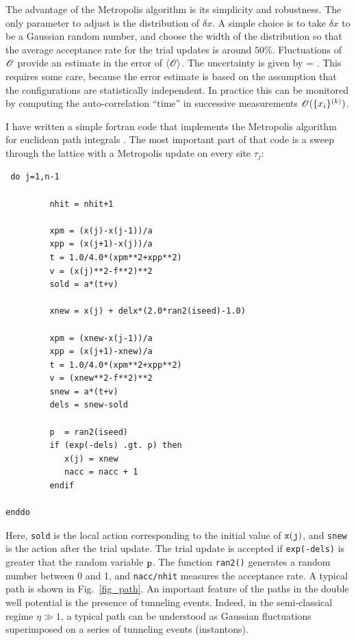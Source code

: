  The advantage of the Metropolis algorithm is its simplicity and robustness. 
The only parameter to adjust is the distribution of $\delta x$. A simple
choice is to take $\delta x$ to be a Gaussian random number, and choose the
width of the distribution so that the average acceptance rate for the trial 
updates is around $50\%$. Fluctuations of ${\cal O}$ provide an estimate 
in the error of $\langle {\cal O}\rangle$. The uncertainty is given by 
\be 
\Delta {} \rangle =
 . 
\ee
This requires some care, because the error estimate is based on 
the assumption that the configurations are statistically independent. 
In practice this can be monitored by computing the auto-correlation 
``time'' in successive measurements ${\cal O}(\{x_i\}^{(k)})$. 

 I have written a simple fortran code that implements the Metropolis 
algorithm for euclidean path integrals \cite{Schafer:2004xa}. The 
most important part of that code is a sweep through the lattice 
with a Metropolis update on every site $\tau_j$: 

\vspace*{0.3cm} 
\begin{lstlisting}
 do j=1,n-1
            
         nhit = nhit+1  
          
         xpm = (x(j)-x(j-1))/a
         xpp = (x(j+1)-x(j))/a
         t = 1.0/4.0*(xpm**2+xpp**2)
         v = (x(j)**2-f**2)**2
         sold = a*(t+v)

         xnew = x(j) + delx*(2.0*ran2(iseed)-1.0)
             
         xpm = (xnew-x(j-1))/a
         xpp = (x(j+1)-xnew)/a
         t = 1.0/4.0*(xpm**2+xpp**2)
         v = (xnew**2-f**2)**2
         snew = a*(t+v)
         dels = snew-sold           
                       
         p  = ran2(iseed)          
         if (exp(-dels) .gt. p) then
            x(j) = xnew
            nacc = nacc + 1
         endif
            
enddo
\end{lstlisting}

\vspace*{0.3cm} 
 Here, {\tt sold} is the local action corresponding to the initial
value of ${\tt x(j)}$, and {\tt snew} is the action after the trial
update. The trial update is accepted if {\tt exp(-dels)} is greater
that the random variable ${\tt p}$. The function {\tt ran2()} generates 
a random number between 0 and 1, and {\tt nacc/nhit} measures the 
acceptance rate. A typical path is shown in Fig.~\ref{fig_path}. An 
important feature of the paths in the double well potential is the 
presence of tunneling events. Indeed, in the semi-classical regime 
$\eta\gg 1$, a typical path can be understood as Gaussian fluctuations 
superimposed on a series of tunneling events (instantons). 

